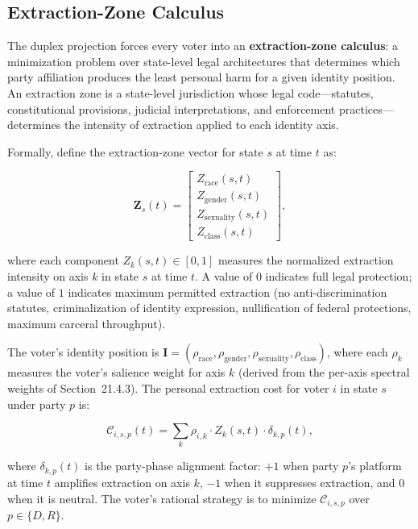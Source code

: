\subsection{Extraction-Zone Calculus}
\label{sec:extraction_zone_calculus}

The duplex projection forces every voter into an \textbf{extraction-zone calculus}: a minimization problem over state-level legal architectures that determines which party affiliation produces the least personal harm for a given identity position. An extraction zone is a state-level jurisdiction whose legal code---statutes, constitutional provisions, judicial interpretations, and enforcement practices---determines the intensity of extraction applied to each identity axis.

Formally, define the extraction-zone vector for state $s$ at time $t$ as:

\begin{equation}\label{eq:21.10-extraction-zone}
\mathbf{Z}_s(t) = \begin{bmatrix} Z_{\text{race}}(s,t) \\ Z_{\text{gender}}(s,t) \\ Z_{\text{sexuality}}(s,t) \\ Z_{\text{class}}(s,t) \end{bmatrix},
\end{equation}

where each component $Z_k(s,t) \in [0,1]$ measures the normalized extraction intensity on axis $k$ in state $s$ at time $t$. A value of $0$ indicates full legal protection; a value of $1$ indicates maximum permitted extraction (no anti-discrimination statutes, criminalization of identity expression, nullification of federal protections, maximum carceral throughput).

The voter's identity position is $\mathbf{I} = (\rho_{\text{race}}, \rho_{\text{gender}}, \rho_{\text{sexuality}}, \rho_{\text{class}})$, where each $\rho_k$ measures the voter's salience weight for axis $k$ (derived from the per-axis spectral weights of Section~21.4.3). The personal extraction cost for voter $i$ in state $s$ under party $p$ is:

\begin{equation}\label{eq:21.11-personal-extraction}
\mathcal{C}_{i,s,p}(t) = \sum_{k} \rho_{i,k} \cdot Z_{k}(s,t) \cdot \delta_{k,p}(t),
\end{equation}

where $\delta_{k,p}(t)$ is the party-phase alignment factor: $+1$ when party $p$'s platform at time $t$ amplifies extraction on axis $k$, $-1$ when it suppresses extraction, and $0$ when it is neutral. The voter's rational strategy is to minimize $\mathcal{C}_{i,s,p}$ over $p \in \{D, R\}$.

